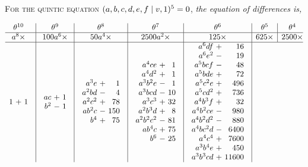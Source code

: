 \noindent\textsc{For the quintic equation} $(a, b, c, d, e, f \mid v, 1)^5 = 0$, \textit{the equation of differences is,}

\begingroup
\tiny
\setlength{\arraycolsep}{1.2pt}
\renewcommand{\arraystretch}{0.72}
\[
\begin{array}{@{}c|c|c|c|c|c|c@{}}
\theta^{10} & \theta^9 & \theta^8 & \theta^7 & \theta^6 & \theta^5 & \theta^4\\
\hline
a^8\times & 100a^6\times & 50a^4\times & 2500a^2\times & 125\times & 625\times & 2500\times\\
\hline
\begin{array}{r@{\ }c@{\ }r}
1&+&1
\end{array}
&
\begin{array}{r@{\ }c@{\ }r}
ac&+&1\\
b^2&-&1
\end{array}
&
\begin{array}{r@{\ }c@{\ }r}
a^3e&+&1\\
a^2bd&-&4\\
a^2c^2&+&78\\
ab^2c&-&150\\
b^4&+&75
\end{array}
&
\begin{array}{r@{\ }c@{\ }r}
a^4ce&+&1\\
a^4d^2&+&1\\
a^3b^2e&-&1\\
a^3bcd&-&10\\
a^3c^3&+&32\\
a^2b^3d&+&8\\
a^2b^2c^2&-&81\\
ab^4c&+&75\\
b^6&-&25
\end{array}
&
\begin{array}{r@{\ }c@{\ }r}
a^6df&+&16\\
a^6e^2&-&19\\
a^5bcf&-&48\\
a^5bde&+&72\\
a^5c^2e&+&496\\
a^5cd^2&+&736\\
a^4b^3f&+&32\\
a^4b^2ce&-&980\\
a^4b^2d^2&-&880\\
a^4bc^2d&-&6400\\
a^4c^4&+&7600\\
a^3b^4e&+&450\\
a^3b^3cd&+&11600\\

\end{array}
\end{array}\]

